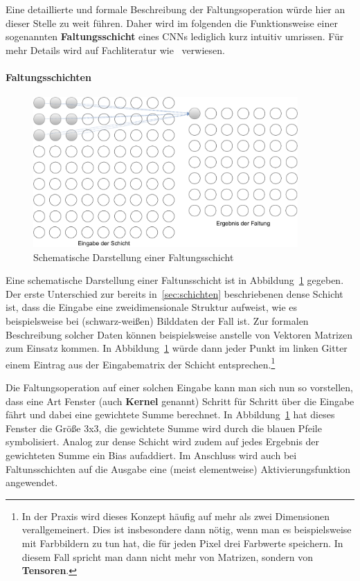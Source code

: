 Eine detaillierte und formale Beschreibung der Faltungsoperation w\"urde
hier an dieser Stelle zu weit f\"uhren. Daher wird im folgenden
die Funktionsweise einer sogenannten \textbf{Faltungsschicht} eines
CNNs lediglich kurz intuitiv umrissen. F\"ur mehr Details wird auf
Fachliteratur wie~\cite{Goodfellow-et-al-2016} verwiesen.

\paragraph{Faltungsschichten}

\begin{figure}
    \centering
    \includegraphics[width=0.9\textwidth]{abbildungen/faltungsschicht}
    \caption{Schematische Darstellung einer Faltungsschicht}
    \label{fig:faltungsschicht}
\end{figure}

Eine schematische Darstellung einer Faltunsschicht ist in
Abbildung~\ref{fig:faltungsschicht} gegeben.
Der erste Unterschied zur bereits in~\ref{sec:schichten} beschriebenen
dense Schicht ist, dass die Eingabe eine zweidimensionale Struktur
aufweist, wie es beispielsweise bei (schwarz-wei{\ss}en) Bilddaten der Fall ist.
Zur formalen Beschreibung solcher Daten k\"onnen beispielsweise anstelle
von Vektoren Matrizen zum Einsatz kommen. In Abbildung~\ref{fig:faltungsschicht}
w\"urde dann jeder Punkt im linken Gitter einem Eintrag aus der Eingabematrix der
Schicht entsprechen.\footnote{In der Praxis wird dieses Konzept h\"aufig auf
    mehr als zwei Dimensionen verallgemeinert. Dies ist insbesondere
    dann n\"otig, wenn man es beispielsweise mit Farbbildern zu tun hat,
    die f\"ur jeden Pixel drei Farbwerte speichern. In diesem Fall spricht man
    dann nicht mehr von Matrizen, sondern von \textbf{Tensoren}.}

Die Faltungsoperation auf einer solchen Eingabe kann man sich nun so
vorstellen, dass eine Art Fenster (auch \textbf{Kernel} genannt)
Schritt f\"ur Schritt \"uber die Eingabe f\"ahrt und dabei eine gewichtete
Summe berechnet. In Abbildung~\ref{fig:faltungsschicht} hat dieses Fenster
die Gr\"o{\ss}e 3x3, die gewichtete Summe wird durch die blauen Pfeile
symbolisiert. Analog zur dense Schicht wird zudem auf jedes Ergebnis
der gewichteten Summe ein Bias aufaddiert. Im Anschluss wird auch bei
Faltunsschichten auf die Ausgabe eine (meist elementweise)
Aktivierungsfunktion angewendet.

